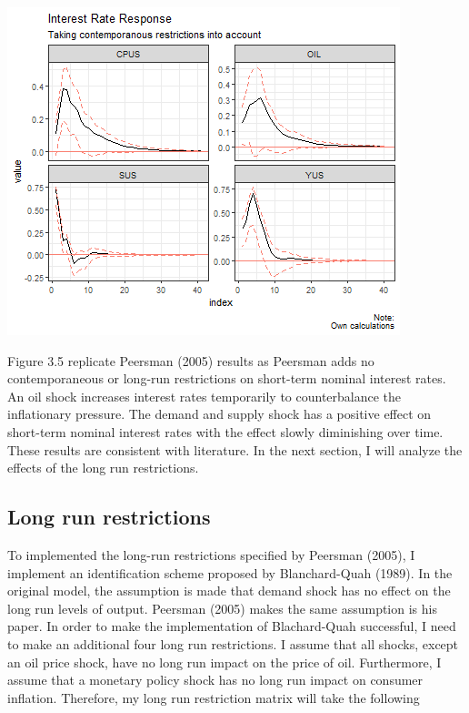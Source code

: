 \documentclass[11pt,preprint, authoryear]{elsarticle}
\let\origfigure\figure
\let\endorigfigure\endfigure
\renewenvironment{figure}[1][2] {
    \expandafter\origfigure\expandafter[H]
} {
    \endorigfigure
}
\numberwithin{equation}{section}
\numberwithin{figure}{section}
\numberwithin{table}{section}
\begin{document}
\begin{figure}[H]

{\centering \includegraphics{replication_files/figure-latex/Figure5-1} 

}

\caption{Interest Rate Response\label{Figure5}}\label{fig:Figure5}
\end{figure}

Figure 3.5 replicate Peersman (2005) results as Peersman adds no
contemporaneous or long-run restrictions on short-term nominal interest
rates. An oil shock increases interest rates temporarily to
counterbalance the inflationary pressure. The demand and supply shock
has a positive effect on short-term nominal interest rates with the
effect slowly diminishing over time. These results are consistent with
literature. In the next section, I will analyze the effects of the long
run restrictions.

\hypertarget{long-run-restrictions}{%
\subsection{Long run restrictions}\label{long-run-restrictions}}

To implemented the long-run restrictions specified by Peersman (2005), I
implement an identification scheme proposed by Blanchard-Quah (1989). In
the original model, the assumption is made that demand shock has no
effect on the long run levels of output. Peersman (2005) makes the same
assumption is his paper. In order to make the implementation of
Blachard-Quah successful, I need to make an additional four long run
restrictions. I assume that all shocks, except an oil price shock, have
no long run impact on the price of oil. Furthermore, I assume that a
monetary policy shock has no long run impact on consumer inflation.
Therefore, my long run restriction matrix will take the following
\end{document}
